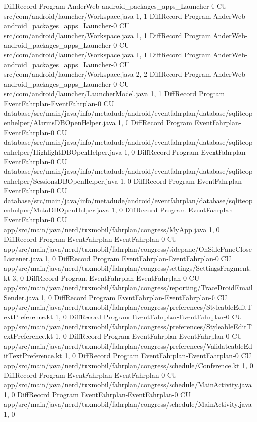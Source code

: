 DiffRecord Program AnderWeb-android_packages_apps_Launcher-0 CU src/com/android/launcher/Workspace.java  {1, 1}
DiffRecord Program AnderWeb-android_packages_apps_Launcher-0 CU src/com/android/launcher/Workspace.java  {1, 1}
DiffRecord Program AnderWeb-android_packages_apps_Launcher-0 CU src/com/android/launcher/Workspace.java  {1, 1}
DiffRecord Program AnderWeb-android_packages_apps_Launcher-0 CU src/com/android/launcher/Workspace.java  {2, 2}
DiffRecord Program AnderWeb-android_packages_apps_Launcher-0 CU src/com/android/launcher/LauncherModel.java  {1, 1}
DiffRecord Program EventFahrplan-EventFahrplan-0 CU database/src/main/java/info/metadude/android/eventfahrplan/database/sqliteopenhelper/AlarmsDBOpenHelper.java  {1, 0}
DiffRecord Program EventFahrplan-EventFahrplan-0 CU database/src/main/java/info/metadude/android/eventfahrplan/database/sqliteopenhelper/HighlightDBOpenHelper.java  {1, 0}
DiffRecord Program EventFahrplan-EventFahrplan-0 CU database/src/main/java/info/metadude/android/eventfahrplan/database/sqliteopenhelper/SessionsDBOpenHelper.java  {1, 0}
DiffRecord Program EventFahrplan-EventFahrplan-0 CU database/src/main/java/info/metadude/android/eventfahrplan/database/sqliteopenhelper/MetaDBOpenHelper.java  {1, 0}
DiffRecord Program EventFahrplan-EventFahrplan-0 CU app/src/main/java/nerd/tuxmobil/fahrplan/congress/MyApp.java  {1, 0}
DiffRecord Program EventFahrplan-EventFahrplan-0 CU app/src/main/java/nerd/tuxmobil/fahrplan/congress/sidepane/OnSidePaneCloseListener.java  {1, 0}
DiffRecord Program EventFahrplan-EventFahrplan-0 CU app/src/main/java/nerd/tuxmobil/fahrplan/congress/settings/SettingsFragment.kt  {3, 0}
DiffRecord Program EventFahrplan-EventFahrplan-0 CU app/src/main/java/nerd/tuxmobil/fahrplan/congress/reporting/TraceDroidEmailSender.java  {1, 0}
DiffRecord Program EventFahrplan-EventFahrplan-0 CU app/src/main/java/nerd/tuxmobil/fahrplan/congress/preferences/StyleableEditTextPreference.kt  {1, 0}
DiffRecord Program EventFahrplan-EventFahrplan-0 CU app/src/main/java/nerd/tuxmobil/fahrplan/congress/preferences/StyleableEditTextPreference.kt  {1, 0}
DiffRecord Program EventFahrplan-EventFahrplan-0 CU app/src/main/java/nerd/tuxmobil/fahrplan/congress/preferences/ValidateableEditTextPreference.kt  {1, 0}
DiffRecord Program EventFahrplan-EventFahrplan-0 CU app/src/main/java/nerd/tuxmobil/fahrplan/congress/schedule/Conference.kt  {1, 0}
DiffRecord Program EventFahrplan-EventFahrplan-0 CU app/src/main/java/nerd/tuxmobil/fahrplan/congress/schedule/MainActivity.java  {1, 0}
DiffRecord Program EventFahrplan-EventFahrplan-0 CU app/src/main/java/nerd/tuxmobil/fahrplan/congress/schedule/MainActivity.java  {1, 0}
